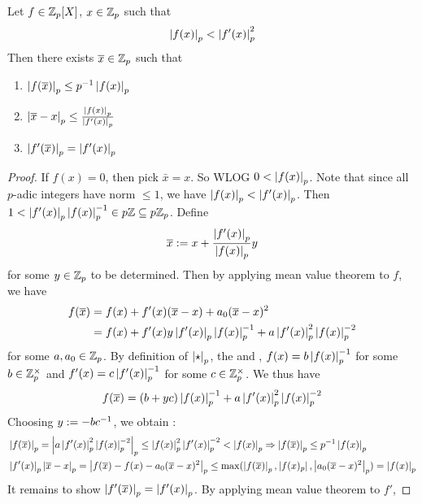 \begin{prop}
  
  Let $f \in \mathbb{Z}_p[X]$, $x \in \mathbb{Z}_p$ such that 
  \[
    \left\vert f(x) \right\vert_p < \left\vert f'(x) \right\vert_p^2
  \]
  Then there exists $\overline{x} \in \mathbb{Z}_p$ such that 
  \begin{enumerate}
    \item $\left\vert f(\overline{x}) \right\vert_p \leq p^{-1}\left\vert f(x) \right\vert_p$
    \item $\left\vert \overline{x} - x \right\vert_p \leq \frac{\left\vert f(x) \right\vert_p}{\left\vert f'(x) \right\vert_p}$
    \item $\left\vert f'(\overline{x}) \right\vert_p = \left\vert f'(x) \right\vert_p$
  \end{enumerate}
\end{prop}
\begin{proof}
  If $f(x) = 0$, then pick $\bar{x} = x$. 
  So WLOG $0 < \left\vert f(x) \right\vert_p$. 
  Note that since all $p$-adic integers have 
  norm $\leq 1$, we have $\left\vert f(x) \right\vert_p < \left\vert f'(x) \right\vert_p$. 
  Then $1 < \left\vert f'(x) \right\vert_p \left\vert f(x) \right\vert_p^{-1} \in p\mathbb{Z} \subseteq p\mathbb{Z}_p$. 
  Define \[
    \overline{x} := x + \frac{\left\vert f'(x) \right\vert_p}{\left\vert f(x) \right\vert_p} y
  \]
  for some $y \in \mathbb{Z}_p$ to be determined. 
  Then by applying mean value theorem to $f$, we have \begin{align*}
    f(\overline{x}) 
    &= f(x) + f'(x)(\overline{x} - x) + a_0 (\overline{x} - x)^2 \\
    &= f(x) + f'(x) y \left\vert f'(x) \right\vert_p \left\vert f(x) \right\vert_p^{-1}
    + a \left\vert f'(x) \right\vert_p^2 \left\vert f(x) \right\vert_p^{-2}
  \end{align*}
  for some $a, a_0 \in \mathbb{Z}_p$.
  By definition of $\left\vert \star \right\vert_p$, 
  the  and 
  , 
  $f(x) = b \left\vert f(x) \right\vert_p^{-1}$ for some $b \in \mathbb{Z}_p^\times$
  and $f'(x) = c \left\vert f'(x) \right\vert_p^{-1}$ for some $c \in \mathbb{Z}_p^\times$.
  We thus have \[
    f(\overline{x}) = \left(b + y c\right)\left\vert f(x) \right\vert_p^{-1} 
    + a \left\vert f'(x) \right\vert_p^2 \left\vert f(x) \right\vert_p^{-2}
  \]
  Choosing $y := -bc^{-1}$, we obtain : 
  \begin{align*}
    &\left\vert f(\overline{x}) \right\vert_p = \left\vert a \left\vert f'(x) \right\vert_p^2 \left\vert f(x) \right\vert_p^{-2} \right\vert_p
    \leq \left\vert f(x) \right\vert_p^2 \left\vert f'(x) \right\vert_p^{-2} < \left\vert f(x) \right\vert_p 
    \Rightarrow \left\vert f(\overline{x}) \right\vert_p \leq p^{-1} \left\vert f(x) \right\vert_p \\
    &\left\vert f'(x) \right\vert_p \left\vert \overline{x} - x \right\vert_p
    = \left\vert f(\overline{x}) - f(x) - a_0 (\overline{x}-x)^2 \right\vert_p
    \leq \max(\left\vert f(\overline{x}) \right\vert_p,\left\vert f(x)_p \right\vert,\left\vert a_0 (\overline{x}-x)^2 \right\vert_p)
    = \left\vert f(x) \right\vert_p 
  \end{align*}
  It remains to show $\left\vert f'(\overline{x}) \right\vert_p = \left\vert f'(x) \right\vert_p$. 
  By applying mean value theorem to $f'$, 

\end{proof}
